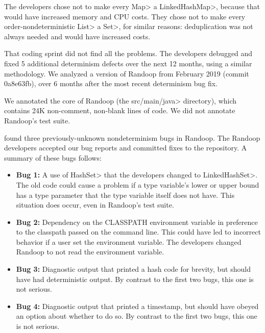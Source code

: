 The developers chose not to make every \<Map> a \<LinkedHashMap>, because that
would have increased memory and CPU costs.  They chose not to make every
order-nondeterministic \<List> a \<Set>, for similar reasons:  deduplication was
not always needed and would have increased costs.


That coding sprint did not find all the problems.
The developers debugged and fixed 5 additional determinism defects over the
next 12 months, using a similar methodology.
We analyzed a version of Randoop from February 2019 (commit 0a8e63fb), over 6 months after the most recent determinism bug fix.

We annotated the core of Randoop (the \<src/main/java> directory), which
contains 24K non-comment, non-blank lines of code.
We did not annotate Randoop's test suite.



\TheDeterminismChecker found three previously-unknown nondeterminism bugs in Randoop.
The Randoop developers accepted our bug reports and committed fixes to the repository. A summary
of these bugs follows:

\begin{itemize}
\item \textbf{Bug 1:}
  A use of \<HashSet> that the developers changed to \<LinkedHashSet>.
The old code could cause a problem if a type variable's lower or upper
bound has a type parameter that the type variable itself does not have.
This situation does occur, even in Randoop's test suite.

\item \textbf{Bug 2:}
Dependency on the CLASSPATH environment variable in preference to the
classpath passed on the command line.
This could have led to incorrect behavior if a user set the environment variable.
The developers changed Randoop to not read the environment variable.

\item \textbf{Bug 3:}
Diagnostic output that printed a hash code for brevity, but should have had
deterministic output.  By contrast to the first two bugs,
this one is not serious.

\item \textbf{Bug 4:}
Diagnostic output that printed a timestamp, but should have obeyed an
option about whether to do so.  By contrast to the first
two bugs, this one is not serious.

\end{itemize}


